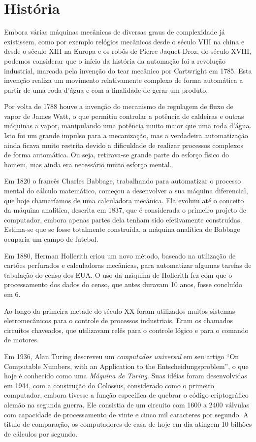 \section{História}

Embora várias máquinas mecânicas de diversas graus de complexidade já existissem, como por exemplo relógios mecânicos desde o século VIII na china e desde o século XIII na Europa e os robôs de Pierre Jaquet-Droz, do século XVIII, podemos considerar que o início da história da automação foi a revolução industrial, marcada pela invenção do tear mecânico por Cartwright em 1785. Esta invenção realiza um movimento relativamente complexo de forma automática a partir de uma roda d'água e com a finalidade de gerar um produto.

Por volta de 1788 houve a invenção do mecanismo de regulagem de fluxo de vapor de James Watt, o que permitiu controlar a potência de caldeiras e outras máquinas a vapor, manipulando uma potência muito maior que uma roda d'água. Isto foi um grande impulso para a mecanização, mas a verdadeira automatização ainda ficava muito restrita devido a dificuldade de realizar processos complexos de forma automática. Ou seja, retirava-se grande parte do esforço físico do homem, mas ainda era necessário muito esforço mental.

Em 1820 o francês Charles Babbage, trabalhando para automatizar o processo mental do cálculo matemático, começou a desenvolver a sua máquina diferencial, que hoje chamaríamos de uma calculadora mecânica. Ela evoluiu até o conceito da máquina analítica, descrita em 1837, que é considerada o primeiro projeto de computador, embora apenas partes dela tenham sido efetivamente construídas. Estima-se que se fosse totalmente construída, a máquina analítica de Babbage ocuparia um campo de futebol.

 Em 1880, Herman Hollerith criou um novo método, baseado na utilização de cartões perfurados e calculadoras mecânicas, para automatizar algumas tarefas de tabulação do censo dos EUA. O uso da máquina de Hollerith fez com que o processamento dos dados do censo, que antes duravam 10 anos, fosse concluído em 6.

Ao longo da primeira metade do século XX foram utilizados muitos sistemas eletromecânicos para o controle de processos industriais. Eram os chamados circuitos chaveados, que utilizavam relês para o controle lógico e para o comando de motores.

Em 1936, Alan Turing descreveu um \emph{computador universal} em seu artigo “On Computable Numbers, with an Application to the Entscheidungsproblem”, o que hoje é conhecido como uma \emph{Máquina de Turing}. Suas idéias foram desenvolvidas em 1944, com a construção do Colossus, considerado como o primeiro computador, embora tivesse a função específica de quebrar o código criptográfico alemão na segunda guerra. Ele consistia de um circuito com 1600 a 2400 válvulas com capacidade de processamento de vinte e cinco mil caracteres por segundo. A titulo de comparação, os computadores de casa de hoje em dia atingem 10 bilhões de cálculos por segundo.

